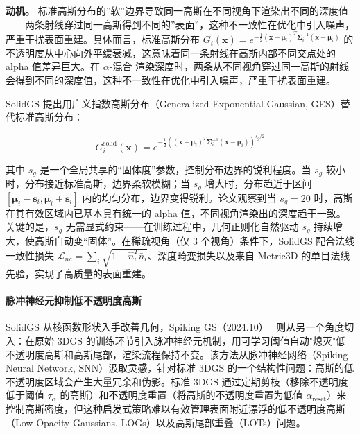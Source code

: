 \textbf{动机。} 标准高斯分布的”软”边界导致同一高斯在不同视角下渲染出不同的深度值——两条射线穿过同一高斯得到不同的”表面”，这种不一致性在优化中引入噪声，严重干扰表面重建。具体而言，标准高斯分布 $G_i(\mathbf{x}) = e^{-\frac{1}{2}(\mathbf{x}-\boldsymbol{\mu}_i)^T \boldsymbol{\Sigma}_i^{-1}(\mathbf{x}-\boldsymbol{\mu}_i)}$ 的不透明度从中心向外平缓衰减，这意味着同一条射线在高斯内部不同交点处的 alpha 值差异巨大。在 $\alpha$-混合 渲染深度时，两条从不同视角穿过同一高斯的射线会得到不同的深度值，这种不一致性在优化中引入噪声，严重干扰表面重建。

SolidGS 提出用广义指数高斯分布（Generalized Exponential Gaussian, GES）替代标准高斯分布：

\begin{equation}
    G_i^{\text{solid}}(\mathbf{x}) = e^{-\frac{1}{2}\left((\mathbf{x}-\boldsymbol{\mu}_i)^T \boldsymbol{\Sigma}_i^{-1}(\mathbf{x}-\boldsymbol{\mu}_i)\right)^{s_g/2}}
\end{equation}

其中 $s_g$ 是一个全局共享的“固体度”参数，控制分布边界的锐利程度。当 $s_g$ 较小时，分布接近标准高斯，边界柔软模糊；当 $s_g$ 增大时，分布趋近于区间 $[\boldsymbol{\mu}_i - \mathbf{s}_i, \boldsymbol{\mu}_i + \mathbf{s}_i]$ 内的均匀分布，边界变得锐利。论文观察到当 $s_g = 20$ 时，高斯在其有效区域内已基本具有统一的 alpha 值，不同视角渲染出的深度趋于一致。关键的是，$s_g$ 无需显式约束——在训练过程中，几何正则化自然驱动 $s_g$ 持续增大，使高斯自动变“固体”。在稀疏视角（仅 3 个视角）条件下，SolidGS 配合法线一致性损失 $\mathcal{L}_{nc} = \sum_i \sqrt{1 - \hat{n}_i^T \bar{n}_i}$、深度畸变损失以及来自 Metric3D 的单目法线先验，实现了高质量的表面重建。

\paragraph{脉冲神经元抑制低不透明度高斯}

SolidGS 从核函数形状入手改善几何，Spiking GS（2024.10）~\cite{2410_07266} 则从另一个角度切入：在原始 3DGS 的训练环节引入脉冲神经元机制，用可学习阈值自动"熄灭"低不透明度高斯和高斯尾部，渲染流程保持不变。该方法从脉冲神经网络（Spiking Neural Network, SNN）汲取灵感，针对标准 3DGS 的一个结构性问题：高斯的低不透明度区域会产生大量冗余和伪影。标准 3DGS 通过定期剪枝（移除不透明度低于阈值 $\tau_{\alpha}$ 的高斯）和不透明度重置（将高斯的不透明度重置为低值 $\alpha_{\text{reset}}$）来控制高斯密度，但这种启发式策略难以有效管理表面附近漂浮的低不透明度高斯（Low-Opacity Gaussians, LOGs）以及高斯尾部重叠（LOTs）问题。

